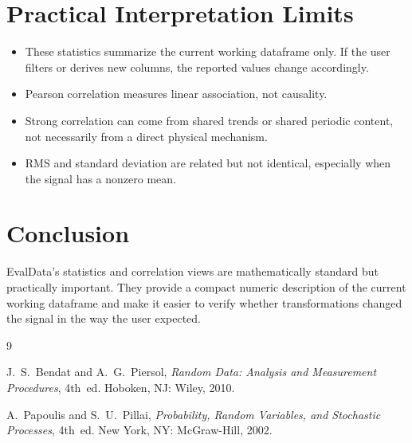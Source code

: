 \documentclass[11pt,a4paper]{article}
\begin{document}
\section{Practical Interpretation Limits}

\begin{itemize}
    \item These statistics summarize the current working dataframe only. If the user filters or derives new columns, the reported values change accordingly.
    \item Pearson correlation measures linear association, not causality.
    \item Strong correlation can come from shared trends or shared periodic content, not necessarily from a direct physical mechanism.
    \item RMS and standard deviation are related but not identical, especially when the signal has a nonzero mean.
\end{itemize}

\section{Conclusion}

EvalData's statistics and correlation views are mathematically standard but practically important. They provide a compact numeric description of the current working dataframe and make it easier to verify whether transformations changed the signal in the way the user expected.

\begin{thebibliography}{9}

J.~S.~Bendat and A.~G.~Piersol,
\emph{Random Data: Analysis and Measurement Procedures}, 4th~ed.
Hoboken, NJ: Wiley, 2010.

A.~Papoulis and S.~U.~Pillai,
\emph{Probability, Random Variables, and Stochastic Processes}, 4th~ed.
New York, NY: McGraw-Hill, 2002.

\end{thebibliography}
\end{document}
